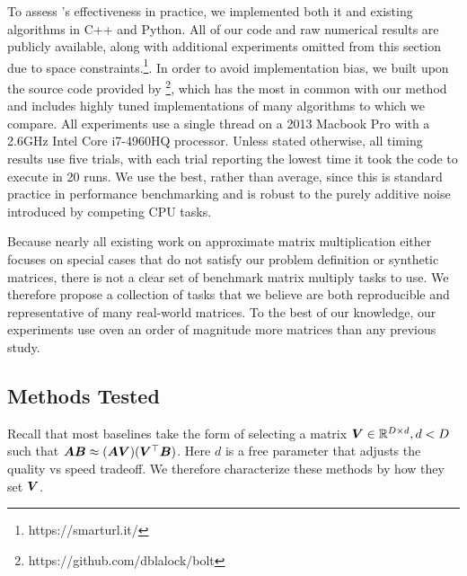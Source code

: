 
To assess \ours's effectiveness in practice, we implemented both it and existing algorithms in C++ and Python. All of our code and raw numerical results are publicly available, along with additional experiments omitted from this section due to space constraints.\footnote{https://smarturl.it/\ours}. In order to avoid implementation bias, we built upon the source code provided by \citep{bolt}\footnote{https://github.com/dblalock/bolt}, which has the most in common with our method and includes highly tuned implementations of many algorithms to which we compare. All experiments use a single thread on a 2013 Macbook Pro with a 2.6GHz Intel Core i7-4960HQ processor. Unless stated otherwise, all timing results use five trials, with each trial reporting the lowest time it took the code to execute in 20 runs. We use the best, rather than average, since this is standard practice in performance benchmarking and is robust to the purely additive noise introduced by competing CPU tasks.

Because nearly all existing work on approximate matrix multiplication either focuses on special cases that do not satisfy our problem definition \cite{quicker-adc, pq, opq} or synthetic matrices, there is not a clear set of benchmark matrix multiply tasks to use. We therefore propose a collection of tasks that we believe are both reproducible and representative of many real-world matrices. To the best of our knowledge, our experiments use oven an order of magnitude more matrices than any previous study.%

\subsection{Methods Tested}
Recall that most baselines take the form of selecting a matrix $\bm{V} \in \mathbb{R}^{D \times d}, d < D$ such that $\bm{A} \bm{B} \approx (\bm{A} \bm{V}) (\bm{V}^\top \bm{B})$. Here $d$ is a free parameter that adjusts the quality vs speed tradeoff. We therefore characterize these methods by how they set $\bm{V}$.

